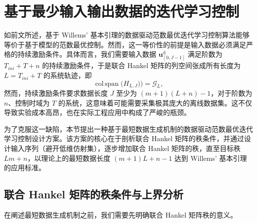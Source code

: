 \chapter{基于最少输入输出数据的迭代学习控制}
\label{chapter-basic}

如前文所述，基于 Willems' 基本引理的数据驱动范数最优迭代学习控制算法能够等价于基于模型的范数最优控制。然而，这一等价性的前提是输入数据必须满足严格的持续激励条件。具体而言，我们需要输入数据 \(\mathbf{u}^{\mathrm{d}}_{[0,J-1]}\) 满足阶数为 \(T_{ini}+T+n\) 的持续激励条件，于是联合 Hankel 矩阵的列空间张成所有长度为 \(L=T_{ini}+T\) 的系统轨迹，即
\begin{equation}
	\operatorname{col\,span}\bigl(H_{L,J})\bigr) = \mathcal{G}_{L},
	\label{eq:willems_rank}
\end{equation}
然而，持续激励条件要求数据长度 \(J\) 至少为 \((m+1)(L+n)-1\)，对于阶数为 $n$、控制时域为 $T$ 的系统，这意味着可能需要采集极其庞大的离线数据集。这不仅导致实验成本高昂，也在实际工程应用中构成了严峻的瓶颈。

为了克服这一缺陷，本节提出一种基于最短数据生成机制的数据驱动范数最优迭代学习控制设计方案。该方案的核心在于剖析联合 Hankel 矩阵的秩条件，并通过设计输入序列（避开低维仿射集），逐步增加联合 Hankel 矩阵的秩，直至目标秩 \(Lm+n\)，以理论上的最短数据长度 \((m+1)L+n-1\) 达到 Willems' 基本引理的应用标准。

\section{联合 Hankel 矩阵的秩条件与上界分析}

在阐述最短数据生成机制之前，我们需要先明确联合 Hankel 矩阵秩的意义。

